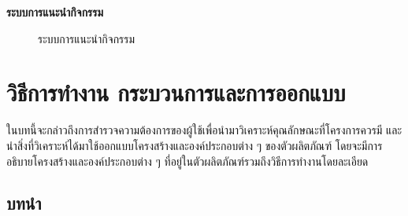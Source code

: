 \documentclass[14pt,oneside,openright,a4paper]{cpe-thai-project}
\begin{document}
\newpage

\large\textbf{ระบบการแนะนำกิจกรรม}

  \begin{figure}[!h]\centering
    \setlength{\fboxrule}{0.5mm} %
    \setlength{\fboxsep}{0.5cm}
    \caption{ระบบการแนะนำกิจกรรม}\label{fig:Suggest}
    \end{figure}

\normalsize
\chapter{วิธีการทำงาน กระบวนการและการออกแบบ}
ในบทนี้จะกล่าวถึงการสำรวจความต้องการของผู้ใช้เพื่อนำมาวิเคราะห์คุณลักษณะที่โครงการควรมี และนำสิ่งที่วิเคราะห์ได้มาใช้ออกแบบโครงสร้างและองค์ประกอบต่าง ๆ ของตัวผลิตภัณฑ์ โดยจะมีการอธิบายโครงสร้างและองค์ประกอบต่าง ๆ ที่อยู่ในตัวผลิตภัณฑ์รวมถึงวิธีการทำงานโดยละเอียด
\section{บทนำ}
\end{document}
